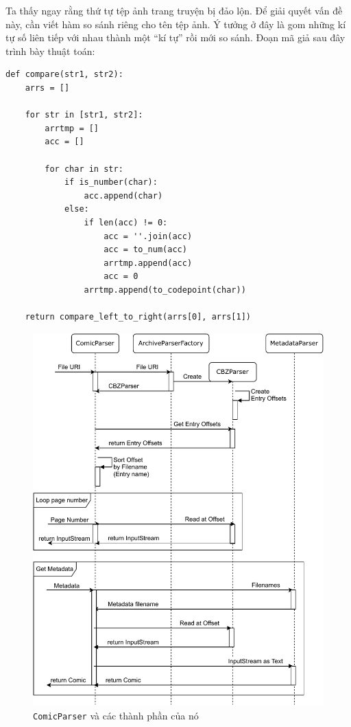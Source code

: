 \documentclass[../../../../thesis]{subfiles}
\begin{document}
Ta thấy ngay rằng thứ tự tệp ảnh trang truyện bị đảo lộn. Để giải quyết vấn đề
này, cần viết hàm so sánh riêng cho tên tệp ảnh. Ý tưởng ở đây là gom những kí
tự số liên tiếp với nhau thành một ``kí tự'' rồi mới so sánh. Đoạn mã giả sau
đây trình bày thuật toán:

\begin{Verbatim}[samepage=true]
def compare(str1, str2):
    arrs = []

    for str in [str1, str2]:
        arrtmp = []
        acc = []

        for char in str:
            if is_number(char):
                acc.append(char)
            else:
                if len(acc) != 0:
                    acc = ''.join(acc)
                    acc = to_num(acc)
                    arrtmp.append(acc)
                    acc = 0
                arrtmp.append(to_codepoint(char))

    return compare_left_to_right(arrs[0], arrs[1])
\end{Verbatim}

\begin{figure}[H]
    \centering
    \includegraphics[scale=0.8]{../images/parser_sequence.pdf}
    \caption{\texttt{ComicParser} và các thành phần của nó}
    \label{fig:parser_sequence}
\end{figure}
\end{document}
